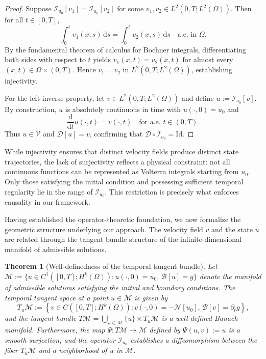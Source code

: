 \documentclass[11pt,reqno]{amsart}
\theoremstyle{plain}
\newtheorem{theorem}{Theorem}[section]
\theoremstyle{definition}
\theoremstyle{remark}
\begin{document}
\begin{proof}
Suppose $\mathcal{I}_{u_0}[v_1] = \mathcal{I}_{u_0}[v_2]$ for some $v_1, v_2 \in L^2(0,T; L^2(\Omega))$. Then for all $t \in [0,T]$,
\[
\int_0^t v_1(x,s) \, \mathrm{d}s = \int_0^t v_2(x,s) \, \mathrm{d}s \quad \text{a.e. in } \Omega.
\]
By the fundamental theorem of calculus for Bochner integrals, differentiating both sides with respect to $t$ yields $v_1(x,t) = v_2(x,t)$ for almost every $(x,t) \in \Omega \times (0,T)$. Hence $v_1 = v_2$ in $L^2(0,T; L^2(\Omega))$, establishing injectivity.

\noindent For the left-inverse property, let $v \in L^2(0,T; L^2(\Omega))$ and define $u := \mathcal{I}_{u_0}[v]$. By construction, $u$ is absolutely continuous in time with $u(\cdot,0) = u_0$ and
\[
\frac{\mathrm{d}}{\mathrm{d}t} u(\cdot,t) = v(\cdot,t) \quad \text{for a.e. } t \in (0,T).
\]
Thus $u \in \mathcal{V}$ and $\mathcal{D}[u] = v$, confirming that $\mathcal{D} \circ \mathcal{I}_{u_0} = \mathrm{Id}$.
\end{proof}

While injectivity ensures that distinct velocity fields produce distinct state trajectories, the lack of surjectivity reflects a physical constraint: not all continuous functions can be represented as Volterra integrals starting from $u_0$. Only those satisfying the initial condition and possessing sufficient temporal regularity lie in the range of $\mathcal{I}_{u_0}$. This restriction is precisely what enforces causality in our framework.

Having established the operator-theoretic foundation, we now formalize the geometric structure underlying our approach. The velocity field $v$ and the state $u$ are related through the tangent bundle structure of the infinite-dimensional manifold of admissible solutions.

\begin{theorem}[Well-definedness of the temporal tangent bundle]\label{thm:tangent_bundle}
Let $\mathcal{M} := \{ u \in C^1([0,T]; H^k(\Omega)) : u(\cdot,0) = u_0, \, \mathcal{B}[u] = g \}$ denote the manifold of admissible solutions satisfying the initial and boundary conditions. The temporal tangent space at a point $u \in \mathcal{M}$ is given by
\[
T_u \mathcal{M} := \left\{ v \in C([0,T]; H^k(\Omega)) : v(\cdot,0) = -\mathcal{N}[u_0], \, \mathcal{B}[v] = \partial_t g \right\},
\]
and the tangent bundle $T\mathcal{M} = \bigcup_{u \in \mathcal{M}} \{u\} \times T_u\mathcal{M}$ is a well-defined Banach manifold. Furthermore, the map $\Psi: T\mathcal{M} \to \mathcal{M}$ defined by $\Psi(u, v) := u$ is a smooth surjection, and the operator $\mathcal{I}_{u_0}$ establishes a diffeomorphism between the fiber $T_u\mathcal{M}$ and a neighborhood of $u$ in $\mathcal{M}$.
\end{theorem}
\end{document}
